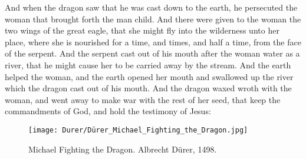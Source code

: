  And when the dragon saw that he was cast down to the earth, he persecuted the woman that brought forth the man child. 
 And there were given to the woman the two wings of the great eagle, that she might fly into the wilderness unto her place, where she is nourished for a time, and times, and half a time, from the face of the serpent. 
 And the serpent cast out of his mouth after the woman water as a river, that he might cause her to be carried away by the stream. 
 And the earth helped the woman, and the earth opened her mouth and swallowed up the river which the dragon cast out of his mouth. 
 And the dragon waxed wroth with the woman, and went away to make war with the rest of her seed, that keep the commandments of God, and hold the testimony of Jesus: 

\begin{figure*}[p]
  	\centering
  	\texttt{[image: Durer/Dürer\_Michael\_Fighting\_the\_Dragon.jpg]}
  	\caption[Michael Fighting the Dragon]{Michael Fighting the Dragon. Albrecht Dürer, 1498.}
  \end{figure*}